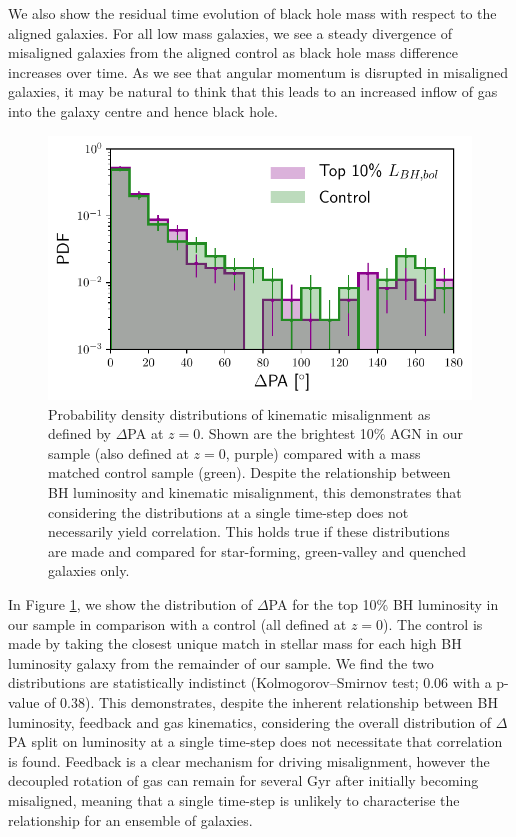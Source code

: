 \documentclass[fleqn,usenatbib]{mnras}
\begin{document}
We also show the residual time evolution of black hole mass with respect to the aligned galaxies. For all low mass galaxies, we see a steady divergence of misaligned galaxies from the aligned control as black hole mass difference increases over time. As we see that angular momentum is disrupted in misaligned galaxies, it may be natural to think that this leads to an increased inflow of gas into the galaxy centre and hence black hole.

\begin{figure}
	\includegraphics[width=\linewidth]{overall_population/PA_distribution_BHlum_split.pdf}
    \caption{Probability density distributions of kinematic misalignment as defined by $\Delta$PA at $z=0$. Shown are the brightest 10\% AGN in our sample (also defined at $z=0$, purple) compared with a mass matched control sample (green). Despite the relationship between BH luminosity and kinematic misalignment, this demonstrates that considering the distributions at a single time-step does not necessarily yield correlation. This holds true if these distributions are made and compared for star-forming, green-valley and quenched galaxies only.}
    \label{fig:PAdist}
\end{figure}

In Figure \ref{fig:PAdist}, we show the distribution of $\Delta$PA for the top 10\% BH luminosity in our sample in comparison with a control (all defined at $z=0$). The control is made by taking the closest unique match in stellar mass for each high BH luminosity galaxy from the remainder of our sample. We find the two distributions are statistically indistinct (Kolmogorov--Smirnov test; 0.06 with a p-value of 0.38). This demonstrates, despite the inherent relationship between BH luminosity, feedback and gas kinematics, considering the overall distribution of $\Delta$PA split on luminosity at a single time-step does not necessitate that correlation is found. Feedback is a clear mechanism for driving misalignment, however the decoupled rotation of gas can remain for several Gyr after initially becoming misaligned, meaning that a single time-step is unlikely to characterise the relationship for an ensemble of galaxies. 
\end{document}
